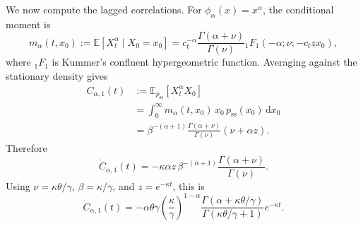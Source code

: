 \documentclass[11pt,twoside,fleqn]{article}
\renewcommand{\d}{\mathrm{d}}
\begin{document}
We now compute the lagged correlations. For \(\phi_\alpha(x)=x^\alpha\), the conditional moment is
\begin{equation}
    m_\alpha(t,x_0)
    :=
    \mathbb{E}[X_t^\alpha\mid X_0=x_0]
    =
    c_t^{-\alpha}
    \frac{\Gamma(\alpha+\nu)}{\Gamma(\nu)}
    {}_1F_1\!\left(
        -\alpha;\nu;-c_t z x_0
    \right),
    \label{eq:cir_conditional_moment_appendix}
\end{equation}
where \({}_1F_1\) is Kummer's confluent hypergeometric function. Averaging against the stationary density gives
\begin{equation}
\begin{aligned}
    C_{\alpha,1}(t)
    &:=
    \mathbb{E}_{p_{\mathrm{ss}}}
    \left[
        X_t^\alpha X_0
    \right]
    \\
    &=
    \int_0^\infty
    m_\alpha(t,x_0)\,
    x_0\,
    p_{\mathrm{ss}}(x_0)\,\d x_0
    \\
    &=
    \beta^{-(\alpha+1)}
    \frac{\Gamma(\alpha+\nu)}{\Gamma(\nu)}
    \left(
        \nu+\alpha z
    \right).
\end{aligned}
\label{eq:cir_power_coordinate_correlation_appendix}
\end{equation}
Therefore
\begin{equation}
    \dot C_{\alpha,1}(t)
    =
    -\kappa\alpha z\,
    \beta^{-(\alpha+1)}
    \frac{\Gamma(\alpha+\nu)}{\Gamma(\nu)}.
    \label{eq:cir_correlation_derivative_beta_appendix}
\end{equation}
Using \(\nu=\kappa\theta/\gamma\), \(\beta=\kappa/\gamma\), and \(z=e^{-\kappa t}\), this is
\begin{equation}
    \dot C_{\alpha,1}(t)
    =
    -\alpha\theta\gamma
    \left(\frac{\kappa}{\gamma}\right)^{1-\alpha}
    \frac{
        \Gamma(\alpha+\kappa\theta/\gamma)
    }{
        \Gamma(\kappa\theta/\gamma+1)
    }
    e^{-\kappa t}.
    \label{eq:cir_correlation_derivative_appendix}
\end{equation}
\end{document}
